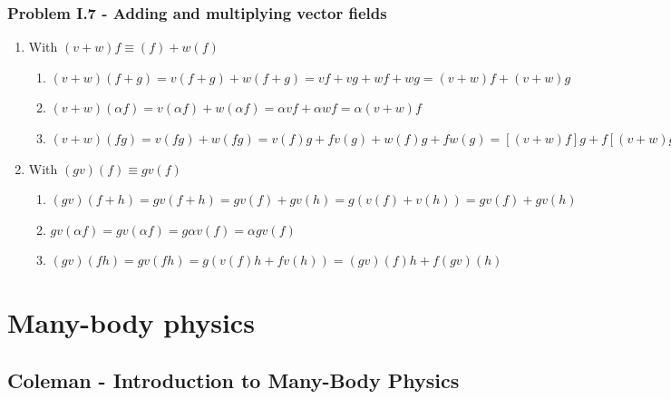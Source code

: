 \documentclass[10pt,a4paper]{article}
\theoremstyle{definition}
\begin{document}
\subsubsection{Problem I.7 - Adding and multiplying vector fields}
\begin{enumerate}
    \item With $(v+w)f\equiv(f)+w(f)$
    \begin{enumerate}
        \item $(v+w)(f+g)=v(f+g)+w(f+g)=vf+vg+wf+wg=(v+w)f+(v+w)g$
        \item $(v+w)(\alpha f)=v(\alpha f)+w(\alpha f)=\alpha v f+\alpha w f=\alpha(v+w)f$
        \item $(v+w)(fg)=v(fg)+w(fg)=v(f)g+fv(g)+w(f)g+fw(g)=[(v+w)f]g+f[(v+w)g]$
    \end{enumerate}
    \item With $(gv)(f)\equiv gv(f)$
    \begin{enumerate}
        \item $(gv)(f+h)=gv(f+h)=gv(f)+gv(h)=g(v(f)+v(h))=gv(f)+gv(h)$
        \item $gv(\alpha f)=gv(\alpha f)=g\alpha v(f)=\alpha gv(f)$
        \item $(gv)(fh)=gv(fh)=g(v(f)h+fv(h))=(gv)(f)h+f(gv)(h)$
    \end{enumerate}
\end{enumerate}


\section{Many-body physics}
\subsection{{\sc Coleman} - Introduction to Many-Body Physics}
\end{document}
